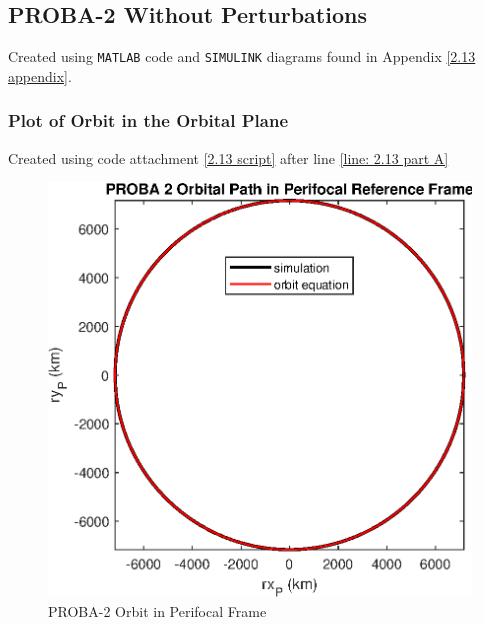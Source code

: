 \documentclass[hidelinks, 12pt]{article}%
\begin{document}
\setcounter{subsection}{12}
\subsection{PROBA-2 Without Perturbations}
\label{question 2.13}
Created using \texttt{MATLAB} code and \texttt{SIMULINK} diagrams found in Appendix \ref{2.13 appendix}.

\subsubsection{Plot of Orbit in the Orbital Plane}
Created using code attachment \ref{2.13 script} after line \ref{line: 2.13 part A}
\begin{figure}[H]
    \begin{centering}
        \includegraphics[width=\textwidth]{output_files/2.13/perifocal_plot.eps}
        \caption{PROBA-2 Orbit in Perifocal Frame}
        \label{perifocal 2.13}
    \end{centering}
\end{figure}
\end{document}
